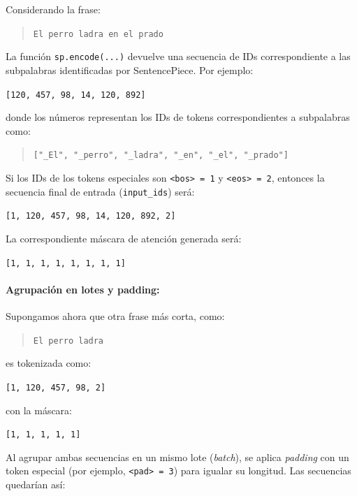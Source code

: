 \documentclass[11pt]{book}
\begin{document}
Considerando la frase:

\begin{quote}
\texttt{El perro ladra en el prado}
\end{quote}

La función \texttt{sp.encode(...)} devuelve una secuencia de IDs correspondiente a las subpalabras identificadas por SentencePiece. Por ejemplo:

\begin{center}
\texttt{[120, 457, 98, 14, 120, 892]}
\end{center}

donde los números representan los IDs de tokens correspondientes a subpalabras como:

\begin{quote}
\texttt{["\_El", "\_perro", "\_ladra", "\_en", "\_el", "\_prado"]}
\end{quote}

Si los IDs de los tokens especiales son \texttt{<bos> = 1} y \texttt{<eos> = 2}, entonces la secuencia final de entrada (\texttt{input\_ids}) será:

\begin{center}
\texttt{[1, 120, 457, 98, 14, 120, 892, 2]}
\end{center}

La correspondiente máscara de atención generada será:

\begin{center}
\texttt{[1, 1, 1, 1, 1, 1, 1, 1]}
\end{center}

\paragraph{Agrupación en lotes y padding:}

Supongamos ahora que otra frase más corta, como:

\begin{quote}
\texttt{El perro ladra}
\end{quote}

es tokenizada como:

\begin{center}
\texttt{[1, 120, 457, 98, 2]}
\end{center}

con la máscara:

\begin{center}
\texttt{[1, 1, 1, 1, 1]}
\end{center}

Al agrupar ambas secuencias en un mismo lote (\textit{batch}), se aplica \textit{padding} con un token especial (por ejemplo, \texttt{<pad> = 3}) para igualar su longitud. Las secuencias quedarían así:
\end{document}
